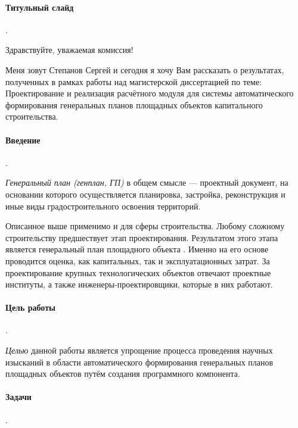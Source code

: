 \documentclass[11pt]{article}
\begin{document}
\paragraph{Титульный слайд}.

Здравствуйте, уважаемая комиссия!

Меня зовут Степанов Сергей и сегодня я хочу Вам рассказать о результатах,
полученных в рамках работы над магистерской диссертацией по теме:
Проектирование и реализация расчётного модуля для системы автоматического формирования
генеральных планов площадных объектов капитального строительства.


\paragraph{Введение}.

\textit{Генеральный план (генплан, ГП)} в общем смысле —
проектный документ, на основании которого осуществляется планировка,
застройка, реконструкция и иные виды градостроительного освоения территорий.

Описанное выше применимо и для сферы строительства.
Любому сложному строительству предшествует этап проектирования.
Результатом этого этапа является генеральный план площадного объекта .
Именно на его основе проводится оценка, как капитальных, так и эксплуатационных затрат.
За проектирование крупных технологических объектов отвечают проектные институты,
а также инженеры-проектировщики, которые в них работают.




\paragraph{Цель работы}.

\textit{Целью} данной работы является
упрощение процесса проведения научных изысканий
в области автоматического формирования генеральных планов площадных объектов
путём создания программного компонента.

\paragraph{Задачи}.
\end{document}
